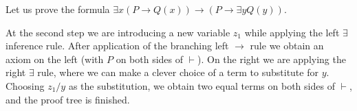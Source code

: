 

\setcounter{section}{2}
\setcounter{subsection}{2}
\setcounter{dfn}{6}

\begin{exl}
Let us prove the formula $\exists x(P \to Q(x)) \to (P \to \exists y Q(y))$.
\begin{prooftree}
\end{prooftree}

At the second step we are introducing a new variable $z_1$ while applying the left $\exists$ inference rule.
After application of the branching left $\to$ rule we obtain an axiom on the left (with $P$ on both sides of $\vdash$).
On the right we are applying the right $\exists$ rule, where we can make a clever choice of a term to substitute for $y$.
Choosing $z_1/y$ as the substitution, we obtain two equal terms on both sides of $\vdash$, and the proof tree is finished.
\end{exl}


